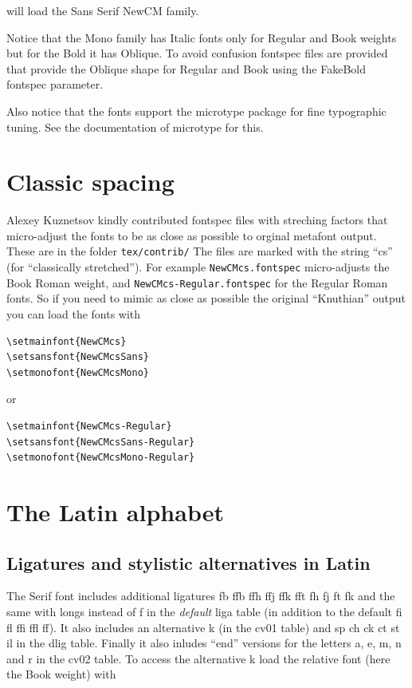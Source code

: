 \documentclass{article}
\begin{document}
\noindent will load the Sans Serif NewCM family. 

Notice that the Mono family has Italic fonts only for Regular and Book weights
but for the Bold it has Oblique. To avoid confusion fontspec files are provided
that provide the Oblique shape for Regular and Book using the FakeBold fontspec parameter.

Also notice that the fonts support the microtype package for fine typographic tuning. See the
documentation of microtype for this.


\section{Classic spacing}

Alexey Kuznetsov kindly contributed fontspec files with streching factors
that micro-adjust the fonts to
be as close as possible to orginal metafont output. These are in the folder
\texttt{tex/contrib/} The files are marked with the string ``cs'' (for ``classically
stretched''). For example \texttt{NewCMcs.fontspec}
micro-adjusts the Book Roman weight, and
\texttt{NewCMcs-Regular.fontspec} for the Regular Roman fonts. So if you need to mimic
as close as possible the original ``Knuthian'' output you can load the fonts with

\begin{verbatim}
\setmainfont{NewCMcs}
\setsansfont{NewCMcsSans}
\setmonofont{NewCMcsMono}
\end{verbatim}

or 

\begin{verbatim}
\setmainfont{NewCMcs-Regular}
\setsansfont{NewCMcsSans-Regular}
\setmonofont{NewCMcsMono-Regular}
\end{verbatim}



\section{The Latin alphabet}

\subsection{Ligatures and stylistic alternatives in Latin}
{\newcmaltk
The Serif font includes additional
ligatures fb ffb ffh ffj ffk fft fh fj ft fk and the same with longs instead of f
in the \textit{default} liga table (in addition to the default fi fl ffi ffl ff).
It also includes an alternative k (in the cv01 table) and
{\newcmdlig sp ch ck ct st il}
in the dlig table. Finally it also inludes} ``end'' {\newcmaltk versions for the letters
a, e, m, n and r in the cv02 table.
}
To access the alternative k load the relative font (here the Book weight) with
\end{document}
